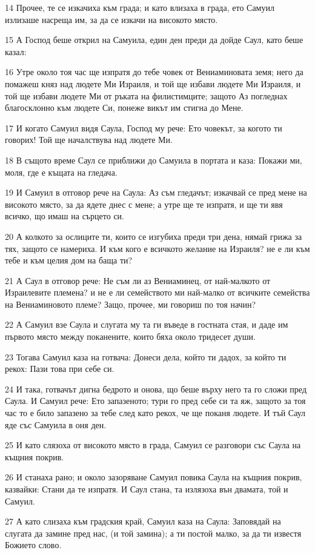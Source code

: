 \par 14 Прочее, те се изкачиха към града; и като влизаха в града, ето Самуил излизаше насреща им, за да се изкачи на високото място.
\par 15 А Господ беше открил на Самуила, един ден преди да дойде Саул, като беше казал:
\par 16 Утре около тоя час ще изпратя до тебе човек от Вениаминовата земя; него да помажеш княз над людете Ми Израиля, и той ще избави людете Ми Израиля, и той ще избави людете Ми от ръката на филистимците; защото Аз погледнах благосклонно към людете Си, понеже викът им стигна до Мене.
\par 17 И когато Самуил видя Саула, Господ му рече: Ето човекът, за когото ти говорих! Той ще началствува над людете Ми.
\par 18 В същото време Саул се приближи до Самуила в портата и каза: Покажи ми, моля, где е къщата на гледача.
\par 19 И Самуил в отговор рече на Саула: Аз съм гледачът; изкачвай се пред мене на високото място, за да ядете днес с мене; а утре ще те изпратя, и ще ти явя всичко, що имаш на сърцето си.
\par 20 А колкото за ослиците ти, които се изгубиха преди три дена, нямай грижа за тях, защото се намериха. И към кого е всичкото желание на Израиля? не е ли към тебе и към целия дом на баща ти?
\par 21 А Саул в отговор рече: Не съм ли аз Вениаминец, от най-малкото от Израилевите племена? и не е ли семейството ми най-малко от всичките семейства на Вениаминовото племе? Защо, прочее, ми говориш по тоя начин?
\par 22 А Самуил взе Саула и слугата му та ги въведе в гостната стая, и даде им първото място между поканените, които бяха около тридесет души.
\par 23 Тогава Самуил каза на готвача: Донеси дела, който ти дадох, за който ти рекох: Пази това при себе си.
\par 24 И така, готвачът дигна бедрото и онова, що беше върху него та го сложи пред Саула. И Самуил рече: Ето запазеното; тури го пред себе си та яж, защото за тоя час то е било запазено за тебе след като рекох, че ще поканя людете. И тъй Саул яде със Самуила в оня ден.
\par 25 И като слязоха от високото място в града, Самуил се разговори със Саула на къщния покрив.
\par 26 И станаха рано; и около зазоряване Самуил повика Саула на къщния покрив, казвайки: Стани да те изпратя. И Саул стана, та излязоха вън двамата, той и Самуил.
\par 27 А като слизаха към градския край, Самуил каза на Саула: Заповядай на слугата да замине пред нас, (и той замина); а ти постой малко, за да ти известя Божието слово.

